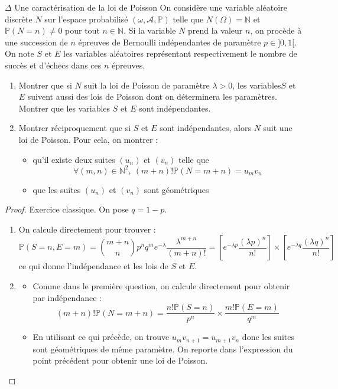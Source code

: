 \documentclass[french,a4paper]{article}
\renewcommand{\P}{\mathbb{P}}
\newcommand{\N}{\mathbb{N}}
\theoremstyle{plain}
\theoremstyle{definition}
\theoremstyle{remark}
\begin{document}
\begin{ex}{$\Delta$ Une caractérisation de la loi de Poisson}
	On considère une variable aléatoire discrète $N$ sur l'espace probabilisé $(\omega,\mathcal{A},\P)$ telle que $N(\Omega)=\N$ et $\P(N=n)\ne0$ pour tout $n\in\N$. Si la variable $N$ prend la valeur $n$, on procède à une succession de $n$ épreuves de Bernoulli indépendantes de paramètre $p\in]0,1[$. On note $S$ et $E$ les variables aléatoires représentant respectivement le nombre de succès et d'échecs dans ces $n$ épreuves.
	\begin{enumerate}
		\item Montrer que si $N$ suit la loi de Poisson de paramètre $\lambda>0$, les variables$S$ et $E$ suivent aussi des lois de Poisson dont on déterminera les paramètres. Montrer que les variables $S$ et $E$ sont indépendantes.
		\item Montrer réciproquement que si $S$ et $E$ sont indépendantes, alors $N$ suit une loi de Poisson. Pour cela, on montrer :
		\begin{itemize}
			\item qu'il existe deux suites $(u_n)$ et $(v_n)$ telle que $$\forall (m,n)\in\N^2,\ (m+n)!\P(N=m+n)=u_mv_n$$
			\item que les suites $(u_n)$ et $(v_n)$ sont géométriques
		\end{itemize}
	\end{enumerate}
\end{ex}
\begin{proof}
	Exercice classique. On pose $q=1-p$.
	\begin{enumerate}
		\item On calcule directement pour trouver : $$\P(S=n,E=m)=\binom{m+n}{n}p^nq^me^{-\lambda}\frac{\lambda^{m+n}}{(m+n)!}=\left[e^{-\lambda p}\frac{(\lambda p)^n}{n!}\right]\times \left[e^{-\lambda q}\frac{(\lambda q)^n}{n!}\right]$$ ce qui donne l'indépendance et les lois de $S$ et $E$.
		\item \begin{itemize}
			\item Comme dans le première question, on calcule directement pour obtenir par indépendance : $$(m+n)!\P(N=m+n)=\frac{n!\P(S=n)}{p^n}\times\frac{m!\P(E=m)}{q^m}$$
			\item En utilisant ce qui précède, on trouve $u_{m}v_{n+1}=u_{m+1}v_n$ donc les suites sont géométriques de même paramètre. On reporte dans l'expression du point précédent pour obtenir une loi de Poisson.
		\end{itemize}
	\end{enumerate}
\end{proof}
\end{document}
